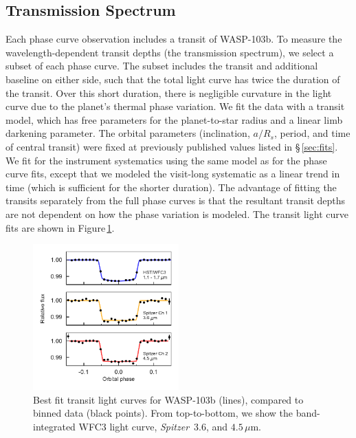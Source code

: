 \documentclass[twocolumn, trackchanges]{aastex61}
\newcommand{\project}[1]{\textsl{#1}}
\newcommand{\Spitzer}{\project{Spitzer}}
\begin{document}
\subsection{Transmission Spectrum}
Each phase curve observation includes a transit of WASP-103b. To measure the
wavelength-dependent transit depths (the transmission spectrum), we select a
subset of each phase curve. The subset includes the transit and additional
baseline on either side, such that the total light curve has twice the duration
of the transit. Over this short duration, there is negligible curvature in the
light curve due to the planet's thermal phase variation. We fit the data with a
transit model, which has free parameters for the planet-to-star radius and a
linear limb darkening parameter. The orbital parameters (inclination, $a/R_s$,
period, and time of central transit) were fixed at previously published values
listed in \S\,\ref{sec:fits}. We fit for the instrument systematics using the
same model as for the phase curve fits, except that we modeled the visit-long
systematic as a linear trend in time (which is sufficient for the shorter
duration). The advantage of fitting the transits separately from the full phase
curves is that the resultant transit depths are not dependent on how the phase
variation is modeled. The transit light curve fits are shown in
Figure\,\ref{fig:transit_light_curves}.

\begin{figure}
\includegraphics[width = 0.5\textwidth]{fig9.pdf}
\caption{Best fit transit light curves for WASP-103b (lines), compared to binned data (black points). From top-to-bottom, we show the band-integrated WFC3 light curve, \Spitzer\ 3.6, and $4.5\,\mu$m.}
\label{fig:transit_light_curves}
\end{figure}
\end{document}

